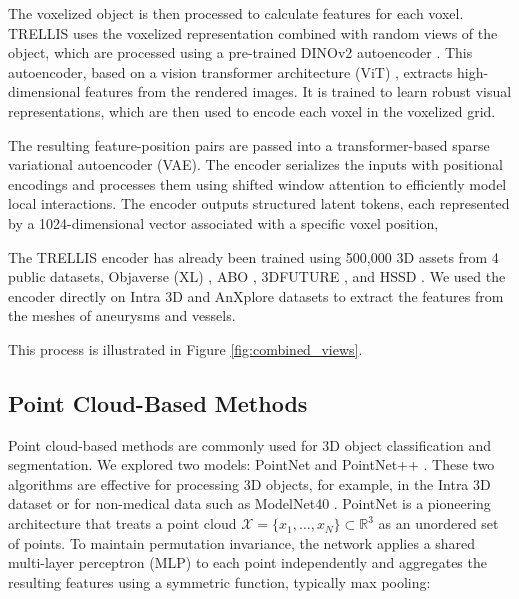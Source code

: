 \documentclass[%
 reprint,
 amsmath,amssymb,
 aps,
 floatfix,
 nofootinbib,
]{revtex4-2}
\begin{document}
The voxelized object is then processed to calculate features for each voxel. TRELLIS uses the voxelized representation combined with random views of the object, which are processed using a pre-trained DINOv2 autoencoder \citep{oquab2024dinov2learningrobustvisual}. This autoencoder, based on a vision transformer architecture (ViT) \citep{dosovitskiy2021imageworth16x16words}, extracts high-dimensional features from the rendered images. It is trained to learn robust visual representations, which are then used to encode each voxel in the voxelized grid.

The resulting feature-position pairs are passed into a transformer-based sparse variational autoencoder (VAE). The encoder serializes the inputs with positional encodings and processes them using shifted window attention to efficiently model local interactions. The encoder outputs structured latent tokens, each represented by a 1024-dimensional vector associated with a specific voxel position,

The TRELLIS encoder has already been trained using 500,000 3D assets from 4 public datasets, Objaverse (XL) \citep{deitke2023objaversexluniverse10m3d} , ABO \citep{collins2022abodatasetbenchmarksrealworld}, 3DFUTURE \citep{fu20203dfuture3dfurnitureshape}, and HSSD \citep{khanna2023habitatsyntheticscenesdataset}. We used the encoder directly on Intra 3D \citep{yang2020intra} and AnXplore \citep{anxplore} datasets to extract the features from the meshes of aneurysms and vessels.  

This process is illustrated in Figure \ref{fig:combined_views}.

\subsection{Point Cloud-Based Methods}

Point cloud-based methods are commonly used for 3D object classification and segmentation. We explored two models: PointNet \citep{pointnet} and PointNet++ \citep{pointnetpp}. These two algorithms are effective for processing 3D objects, for example, in the Intra 3D dataset \citep{yang2020intra} or for non-medical data such as ModelNet40 \citep{7298801}.
PointNet is a pioneering architecture that treats a point cloud \( \mathcal{X} = \{x_1, \dots, x_N\} \subset \mathbb{R}^3 \) as an unordered set of points. To maintain permutation invariance, the network applies a shared multi-layer perceptron (MLP) to each point independently and aggregates the resulting features using a symmetric function, typically max pooling:
\end{document}
